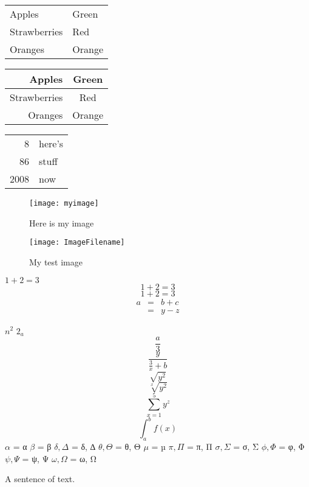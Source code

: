 \documentclass[a4paper,12pt]{article}
\begin{document}
\begin{tabular}{|l|l|}
Apples & Green \\
Strawberries & Red \\
Oranges & Orange \\
\end{tabular}
\begin{tabular}{rc}
Apples & Green \\
\hline
Strawberries & Red \\
\cline{1-1}
Oranges & Orange \\
\end{tabular}
\begin{tabular}{|r|l|}
\hline
8 & here’s \\
\cline{2-2}
86 & stuff \\
\hline \hline
2008 & now \\
\hline
\end{tabular}

\begin{figure}[h]
\centering
\texttt{[image: myimage]}
\caption{Here is my image}
\label{image-myimage}
\end{figure}

\begin{figure}[h!]
\centering
\texttt{[image: ImageFilename]}
\caption{My test image}
\end{figure}

$1+2=3$
$$1+2=3$$
\begin{equation}1+2=3\end{equation}
\begin{eqnarray}
  a & = & b + c \\
    & = & y - z
\end{eqnarray}

$n^2$
$2_a$ 
$$\frac{a}{3}$$
$$\frac{y}{\frac{3}{x}+b}$$
$$\sqrt{y^2}$$
$$\sqrt[x]{y^2}$$
$$\sum_{x=1}^5 y^z$$
$$\int_a^b f(x)$$
$\alpha$ = α
$\beta$ = β
$\delta, \Delta$ = δ, ∆
$\theta, \Theta$ = θ, Θ
$\mu$ = µ
$\pi, \Pi$ = π, Π
$\sigma, \Sigma$ = σ, Σ
$\phi, \Phi$ = φ, Φ
$\psi, \Psi$ = ψ, Ψ
$\omega, \Omega$ = ω, Ω

A sentence of text.
\end{document}
